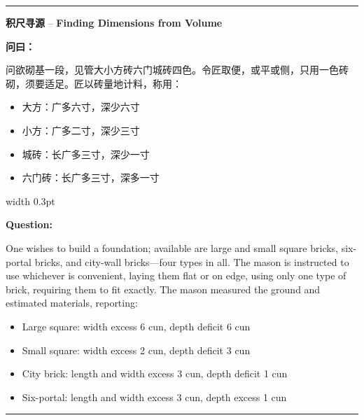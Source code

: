\documentclass[10pt,a4paper]{article}
\newcommand{\cnlabel}[1]{\textcolor{labelcolor}{\textbf{#1}}}
\newcommand{\enlabel}[1]{\textcolor{labelcolor}{\textbf{#1}}}
\newenvironment{problemsection}{%
  \medskip\par\noindent\textcolor{rulecolor}{\rule{\textwidth}{0.4pt}}\par\smallskip%
}{\par\smallskip\noindent\textcolor{rulecolor}{\rule{\textwidth}{0.4pt}}\par\medskip}
\begin{document}
\begin{problemsection}

\noindent\begin{minipage}[t]{\textwidth}
\begin{center}
\textbf{积尺寻源} -- \textbf{Finding Dimensions from Volume}
\end{center}
\end{minipage}

\vspace{0.3em}

\noindent\begin{minipage}[t]{0.47\textwidth}
\begin{flushleft}
\small
\cnlabel{问曰：}

问欲砌基一段，见管大小方砖六门城砖四色。令匠取便，或平或侧，只用一色砖砌，须要适足。匠以砖量地计料，称用：
\begin{itemize}[leftmargin=*,nosep,topsep=2pt]
  \item 大方：广多六寸，深少六寸
  \item 小方：广多二寸，深少三寸
  \item 城砖：长广多三寸，深少一寸
  \item 六门砖：长广多三寸，深多一寸
\end{itemize}
\end{flushleft}
\end{minipage}%
\hfill\vrule width 0.3pt\hfill%
\begin{minipage}[t]{0.47\textwidth}
\begin{flushleft}
\small
\enlabel{Question:}

One wishes to build a foundation; available are large and small square bricks, six-portal bricks, and city-wall bricks---four types in all. The mason is instructed to use whichever is convenient, laying them flat or on edge, using only one type of brick, requiring them to fit exactly. The mason measured the ground and estimated materials, reporting:
\begin{itemize}[leftmargin=*,nosep,topsep=2pt]
  \item Large square: width excess 6 cun, depth deficit 6 cun
  \item Small square: width excess 2 cun, depth deficit 3 cun
  \item City brick: length and width excess 3 cun, depth deficit 1 cun
  \item Six-portal: length and width excess 3 cun, depth excess 1 cun
\end{itemize}
\end{flushleft}
\end{minipage}


\end{problemsection}
\end{document}
